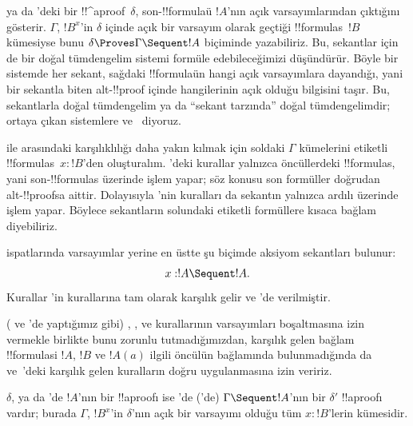 



 ya da 'deki bir !!^a{proof}~$\delta$, son-!!{formula}{}ü
$!A$'nın açık varsayımlarından çıktığını gösterir. $\Gamma$, $!B^x$'in
$\delta$ içinde açık bir varsayım olarak geçtiği !!{formula}s~$!B$ kümesiyse
bunu $\delta \Proves \Gamma \Sequent !A$ biçiminde yazabiliriz. Bu, sekantlar
için de bir doğal tümdengelim sistemi formüle edebileceğimizi düşündürür.
Böyle bir sistemde her sekant, sağdaki !!{formula}{}ün hangi açık varsayımlara
dayandığı, yani bir sekantla biten alt-!!{proof} içinde hangilerinin açık
olduğu bilgisini taşır. Bu, sekantlarla doğal tümdengelim ya da ``sekant
tarzında'' doğal tümdengelimdir; ortaya çıkan sistemlere 
ve~ diyoruz.

 ile  arasındaki karşılıklılığı daha yakın kılmak için soldaki
$\Gamma$ kümelerini etiketli !!{formula}s~$x:!B$'den oluşturalım. 'deki
kurallar yalnızca öncüllerdeki !!{formula}s, yani son-!!{formula}s üzerinde
işlem yapar; söz konusu son formüller doğrudan alt-!!{proof}s{}a aittir.
Dolayısıyla 'nin kuralları da
sekantın yalnızca ardılı üzerinde işlem yapar. Böylece sekantların solundaki
etiketli formüllere kısaca bağlam diyebiliriz.

 ispatlarında varsayımlar yerine en üstte şu biçimde aksiyom
sekantları bulunur:
\[x:!A \Sequent !A.\]
Kurallar 'in kurallarına tam olarak karşılık gelir ve
'de verilmiştir.


( ve 'de yaptığımız gibi) \Intro{\lif}, \Intro{\lnot},
\Elim{\lor} ve \Elim{\lexists} kurallarının varsayımları boşaltmasına izin
vermekle birlikte bunu zorunlu tutmadığımızdan, karşılık gelen bağlam
!!{formula}s{}i $!A$, $!B$ ve $!A(a)$ ilgili öncülün bağlamında bulunmadığında
da  ve~'deki karşılık gelen kuralların doğru uygulanmasına
izin veririz.

\begin{prop}
$\delta$,  ya da 'de $!A$'nın bir !!a{proof}{}ı ise
'de ('de) $\Gamma \Sequent !A$'nın bir $\delta'$ !!a{proof}{}ı
vardır; burada $\Gamma$, $!B^x$'in $\delta$'nın açık bir varsayımı olduğu tüm
$x:!B$'lerin kümesidir.
\end{prop}

